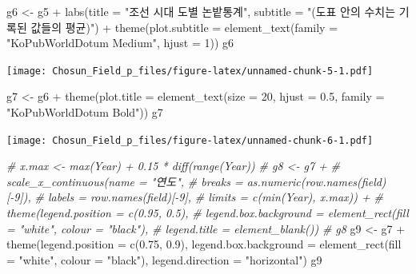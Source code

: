 \documentclass[
]{article}
\newenvironment{Shaded}{\begin{snugshade}}{\end{snugshade}}
\newcommand{\AttributeTok}[1]{\textcolor[rgb]{0.77,0.63,0.00}{#1}}
\newcommand{\CommentTok}[1]{\textcolor[rgb]{0.56,0.35,0.01}{\textit{#1}}}
\newcommand{\DecValTok}[1]{\textcolor[rgb]{0.00,0.00,0.81}{#1}}
\newcommand{\FloatTok}[1]{\textcolor[rgb]{0.00,0.00,0.81}{#1}}
\newcommand{\FunctionTok}[1]{\textcolor[rgb]{0.00,0.00,0.00}{#1}}
\newcommand{\NormalTok}[1]{#1}
\newcommand{\OtherTok}[1]{\textcolor[rgb]{0.56,0.35,0.01}{#1}}
\newcommand{\SpecialCharTok}[1]{\textcolor[rgb]{0.00,0.00,0.00}{#1}}
\newcommand{\StringTok}[1]{\textcolor[rgb]{0.31,0.60,0.02}{#1}}
\begin{document}
\begin{Shaded}
\begin{Highlighting}[]
\NormalTok{g6 }\OtherTok{\textless{}{-}}\NormalTok{ g5 }\SpecialCharTok{+}
  \FunctionTok{labs}\NormalTok{(}\AttributeTok{title =} \StringTok{"조선 시대 도별 논밭통계"}\NormalTok{, }
       \AttributeTok{subtitle =} \StringTok{"(도표 안의 수치는 기록된 값들의 평균)"}\NormalTok{) }\SpecialCharTok{+}
  \FunctionTok{theme}\NormalTok{(}\AttributeTok{plot.subtitle =} \FunctionTok{element\_text}\NormalTok{(}\AttributeTok{family =} \StringTok{"KoPubWorldDotum Medium"}\NormalTok{, }
                                     \AttributeTok{hjust =} \DecValTok{1}\NormalTok{))}
\NormalTok{g6}
\end{Highlighting}
\end{Shaded}

\texttt{[image: Chosun\_Field\_p\_files/figure-latex/unnamed-chunk-5-1.pdf]}

\begin{Shaded}
\begin{Highlighting}[]
\NormalTok{g7 }\OtherTok{\textless{}{-}}\NormalTok{ g6 }\SpecialCharTok{+}
  \FunctionTok{theme}\NormalTok{(}\AttributeTok{plot.title =} \FunctionTok{element\_text}\NormalTok{(}\AttributeTok{size =} \DecValTok{20}\NormalTok{, }
                                  \AttributeTok{hjust =} \FloatTok{0.5}\NormalTok{,}
                                  \AttributeTok{family =} \StringTok{"KoPubWorldDotum Bold"}\NormalTok{))}
\NormalTok{g7}
\end{Highlighting}
\end{Shaded}

\texttt{[image: Chosun\_Field\_p\_files/figure-latex/unnamed-chunk-6-1.pdf]}

\begin{Shaded}
\begin{Highlighting}[]
\CommentTok{\#  x.max \textless{}{-} max(Year) + 0.15 * diff(range(Year))}
\CommentTok{\# g8 \textless{}{-} g7 +}
\CommentTok{\#  scale\_x\_continuous(name = "연도", }
\CommentTok{\#                     breaks = as.numeric(row.names(field)[{-}9]),}
\CommentTok{\#                     labels = row.names(field)[{-}9],}
\CommentTok{\#                     limits = c(min(Year), x.max)) +}
\CommentTok{\#  theme(legend.position = c(0.95, 0.5),}
\CommentTok{\#        legend.box.background = element\_rect(fill = "white", colour = "black"),}
\CommentTok{\#        legend.title = element\_blank())}
\CommentTok{\# g8}
\NormalTok{g9 }\OtherTok{\textless{}{-}}\NormalTok{ g7 }\SpecialCharTok{+}
  \FunctionTok{theme}\NormalTok{(}\AttributeTok{legend.position =} \FunctionTok{c}\NormalTok{(}\FloatTok{0.75}\NormalTok{, }\FloatTok{0.9}\NormalTok{),}
        \AttributeTok{legend.box.background =} \FunctionTok{element\_rect}\NormalTok{(}\AttributeTok{fill =} \StringTok{"white"}\NormalTok{, }\AttributeTok{colour =} \StringTok{"black"}\NormalTok{),}
        \AttributeTok{legend.direction =} \StringTok{"horizontal"}\NormalTok{)}
\NormalTok{g9}
\end{Highlighting}
\end{Shaded}
\end{document}
